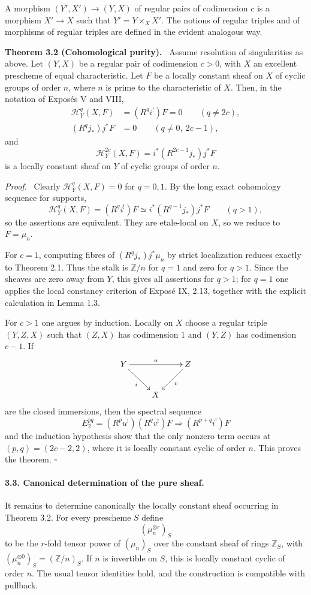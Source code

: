 \documentclass[12pt]{article}
\newcommand{\ZZ}{\mathbb Z}
\newcommand{\qedtext}{\hfill\(\square\)}
\newenvironment{statement}[1]{\par\medskip\noindent\textbf{#1.}\ }{\par\medskip}
\newenvironment{prooftext}[1][Proof]{\par\noindent\emph{#1.}\ }{\par\medskip}
\begin{document}
A morphism $(Y',X')\to(Y,X)$ of regular pairs of codimension $c$ is a morphism $X'\to X$ such that $Y'=Y\times_XX'$. The notions of regular triples and of morphisms of regular triples are defined in the evident analogous way.

\begin{statement}{Theorem 3.2 (Cohomological purity)}
Assume resolution of singularities as above. Let $(Y,X)$ be a regular pair of codimension $c>0$, with $X$ an excellent prescheme of equal characteristic. Let $F$ be a locally constant sheaf on $X$ of cyclic groups of order $n$, where $n$ is prime to the characteristic of $X$. Then, in the notation of Expos\'es V and VIII,
\begin{align*}
\mathcal H^q_Y(X,F)&=(R^qi^!)F=0\qquad(q\ne 2c),\\
(R^qj_*)j^*F&=0\qquad(q\ne0,\ 2c-1),
\end{align*}
and
\[
   \mathcal H_Y^{2c}(X,F)=i^*(R^{2c-1}j_*)j^*F
\]
is a locally constant sheaf on $Y$ of cyclic groups of order $n$.
\end{statement}

\begin{prooftext}
Clearly $\mathcal H_Y^q(X,F)=0$ for $q=0,1$. By the long exact cohomology sequence for supports,
\[
   \mathcal H_Y^q(X,F)=(R^qi^!)F\simeq i^*(R^{q-1}j_*)j^*F\qquad(q>1),
\]
so the assertions are equivalent. They are etale-local on $X$, so we reduce to $F=\mu_n$.

For $c=1$, computing fibres of $(R^qj_*)j^*\mu_n$ by strict localization reduces exactly to Theorem 2.1. Thus the stalk is $\ZZ/n$ for $q=1$ and zero for $q>1$. Since the sheaves are zero away from $Y$, this gives all assertions for $q>1$; for $q=1$ one applies the local constancy criterion of Expos\'e IX, 2.13, together with the explicit calculation in Lemma 1.3.

For $c>1$ one argues by induction. Locally on $X$ choose a regular triple $(Y,Z,X)$ such that $(Z,X)$ has codimension $1$ and $(Y,Z)$ has codimension $c-1$. If
\[
\xymatrix{Y\ar[rr]^u\ar[rd]_i&&Z\ar[ld]^v\\&X&}
\]
are the closed immersions, then the spectral sequence
\[
   E_2^{pq}=(R^pu^!)(R^qv^!)F\Longrightarrow(R^{p+q}i^!)F
\]
and the induction hypothesis show that the only nonzero term occurs at $(p,q)=(2c-2,2)$, where it is locally constant cyclic of order $n$. This proves the theorem. \qedtext
\end{prooftext}

\paragraph{3.3. Canonical determination of the pure sheaf.}
It remains to determine canonically the locally constant sheaf occurring in Theorem 3.2. For every prescheme $S$ define
\[
   (\mu_n^{\otimes r})_S
\]
to be the $r$-fold tensor power of $(\mu_n)_S$ over the constant sheaf of rings $\ZZ_S$, with $(\mu_n^{\otimes0})_S=(\ZZ/n)_S$. If $n$ is invertible on $S$, this is locally constant cyclic of order $n$. The usual tensor identities hold, and the construction is compatible with pullback.
\end{document}
